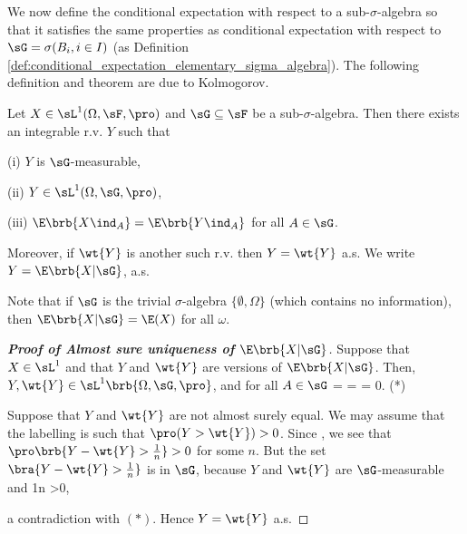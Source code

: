 We now define the conditional expectation with respect to a sub-$\sigma$-algebra so that it satisfies the same properties as conditional expectation with respect to $\sG = \sigma(B_i , i \in I)$ (as Definition \ref{def:conditional_expectation_elementary_sigma_algebra}). The following definition and theorem are due to Kolmogorov.

\begin{theorem}\label{thm:conditional_expectation_existence_uniqueness}
Let $X \in \sL^1(\Omega,\sF,\pro)$ and $\sG \subseteq \sF$ be a sub-$\sigma$-algebra. Then there exists an integrable r.v. $Y$ such that
\ben
\item [(i)] $Y$ is $\sG$-measurable,
\item [(ii)] $Y \in \sL^1(\Omega,\sG,\pro)$,
\item [(iii)] $\E\brb{X\ind_A} = \E\brb{Y\ind_A}$ for all $A \in \sG$.
\een

Moreover, if $\wt{Y}$ is another such r.v. then $Y = \wt{Y}$ a.s. We write $Y = \E\brb{X|\sG}$, a.s.
\end{theorem}

\begin{remark}
Note that if $\sG$ is the trivial $\sigma$-algebra $\{\emptyset, \Omega\}$ (which contains no information), then $\E\brb{X|\sG} = \E(X)$ for all $\omega$.
\end{remark}

\begin{proof}[\bf Proof of Almost sure uniqueness of $\E\brb{X|\sG}$]
Suppose that $X\in \sL^1$ and that $Y$ and $\wt{Y}$ are versions of $\E\brb{X|\sG}$. Then, $Y,\wt{Y} \in \sL^1\brb{\Omega,\sG,\pro}$, and for all $A\in \sG$
\be
\E {} = \E {} = \E {}\quad\ra\quad \E{} = 0. \quad (*)\quad {}
\ee

Suppose that $Y$ and $\wt{Y}$ are not almost surely equal. We may assume that the labelling is such that $\pro(Y>\wt{Y}) >0$. Since
\be
{} \ua {},
\ee
we see that $\pro\brb{Y-\wt{Y} > \frac 1n} >0$ for some $n$. But the set $\bra{Y-\wt{Y}> \frac 1n}$ is in $\sG$, because $Y$ and $\wt{Y}$ are $\sG$-measurable and
\be
\E{} \geq \frac 1n \pro{} >0,
\ee

a contradiction with $(*)$. Hence $Y=\wt{Y}$ a.s.
\end{proof}

